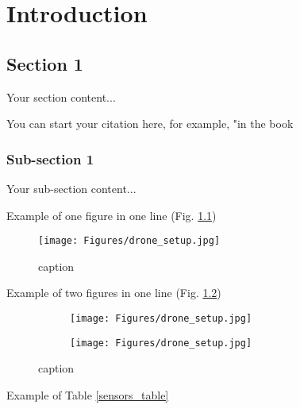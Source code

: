 \chapter{Introduction} 

\label{Introduction}

\section{Section 1}
Your section content...

You can start your citation here, for example, "in the book \cite{titterton2004strapdown}
\subsection{Sub-section 1}
Your sub-section content...

Example of one figure in one line (Fig. \ref{drone_fig_1})

\begin{figure}
	\centering
	\texttt{[image: Figures/drone\_setup.jpg]}
	\caption{caption}
	\label{drone_fig_1}
\end{figure}
	

Example of two figures in one line (Fig. \ref{drone_fig_2})
\begin{figure}
	\centering
	\begin{subfigure}[b]{0.49\textwidth}
		\centering
		\texttt{[image: Figures/drone\_setup.jpg]}
	\end{subfigure}
	\begin{subfigure}[b]{0.49\textwidth}
		\centering
		\texttt{[image: Figures/drone\_setup.jpg]}
	\end{subfigure}
	\caption{caption}
	\label{drone_fig_2}
\end{figure}

Example of Table \ref{sensors_table}

